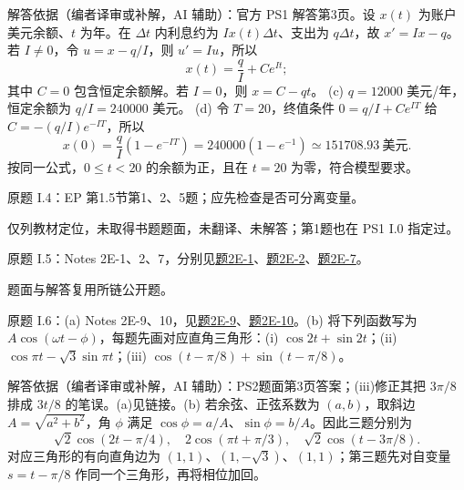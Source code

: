 \begin{solution}
解答依据（编者译审或补解，AI 辅助）：官方 PS1 解答第3页。设 $x(t)$ 为账户美元余额、$t$ 为年。在 $\Delta t$ 内利息约为 $Ix(t)\Delta t$、支出为 $q\Delta t$，故 $x'=Ix-q$。若 $I\ne0$，令 $u=x-q/I$，则 $u'=Iu$，所以
\[
 x(t)=\frac qI+Ce^{It};
\]
其中 $C=0$ 包含恒定余额解。若 $I=0$，则 $x=C-qt$。
(c) $q=12000$ 美元/年，恒定余额为 $q/I=240000$ 美元。
(d) 令 $T=20$，终值条件 $0=q/I+Ce^{IT}$ 给 $C=-(q/I)e^{-IT}$，所以
\[
 x(0)=\frac qI(1-e^{-IT})=240000(1-e^{-1})
 \simeq151708.93\ \text{美元}.
\]
按同一公式，$0\leq t<20$ 的余额为正，且在 $t=20$ 为零，符合模型要求。
\end{solution}

\label{cw:ps2}
\begin{exercise}\label{cw:ps2-I-4}原题 I.4：EP 第1.5节第1、2、5题；应先检查是否可分离变量。\end{exercise}
\begin{solution}仅列教材定位，未取得书题题面，未翻译、未解答；第1题也在 PS1 I.0 指定过。\end{solution}
\begin{exercise}\label{cw:ps2-I-5}原题 I.5：Notes 2E-1、2、7，分别见\hyperref[cw:bank-2E-1]{题2E-1}、\hyperref[cw:bank-2E-2]{题2E-2}、\hyperref[cw:bank-2E-7]{题2E-7}。\end{exercise}
\begin{solution}题面与解答复用所链公开题。\end{solution}
\begin{exercise}\label{cw:ps2-I-6}原题 I.6：(a) Notes 2E-9、10，见\hyperref[cw:bank-2E-9]{题2E-9}、\hyperref[cw:bank-2E-10]{题2E-10}。(b) 将下列函数写为 $A\cos(\omega t-\phi)$，每题先画对应直角三角形：(i) $\cos2t+\sin2t$；(ii) $\cos\pi t-\sqrt3\sin\pi t$；(iii) $\cos(t-\pi/8)+\sin(t-\pi/8)$。\end{exercise}
\begin{solution}
解答依据（编者译审或补解，AI 辅助）：PS2题面第3页答案；(iii)修正其把 $3\pi/8$ 排成 $3t/8$ 的笔误。(a)见链接。(b) 若余弦、正弦系数为 $(a,b)$，取斜边 $A=\sqrt{a^2+b^2}$，角 $\phi$ 满足 $\cos\phi=a/A$、$\sin\phi=b/A$。因此三题分别为
\[
 \sqrt2\cos(2t-\pi/4),\quad 2\cos(\pi t+\pi/3),\quad
 \sqrt2\cos(t-3\pi/8).
\]
对应三角形的有向直角边为 $(1,1)$、$(1,-\sqrt3)$、$(1,1)$；第三题先对自变量 $s=t-\pi/8$ 作同一个三角形，再将相位加回。
\begin{center}\end{center}
\end{solution}
